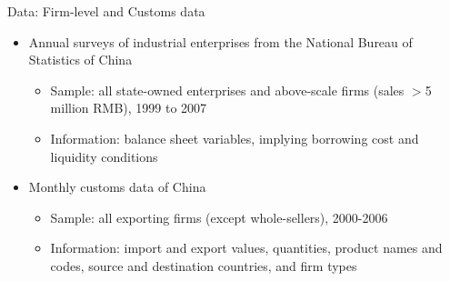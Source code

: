 \documentclass[10pt]{beamer}
\begin{document}
\begin{frame}{Data: Firm-level and Customs data}
    \begin{itemize}
	\item Annual surveys of industrial enterprises from the National Bureau of Statistics of China
	\begin{itemize}
		\item Sample: all state-owned enterprises and above-scale firms (sales $>$5 million RMB), 1999 to 2007 
            \item Information: balance sheet variables, implying borrowing cost and liquidity conditions
	\end{itemize}
        \medskip
        \item Monthly customs data of China
        \begin{itemize}
            \item Sample: all exporting firms (except whole-sellers), 2000-2006
            \item Information: import and export values, quantities, product names and codes, source and destination countries, and firm types
	\end{itemize}
    \end{itemize}
\end{frame}
\end{document}
